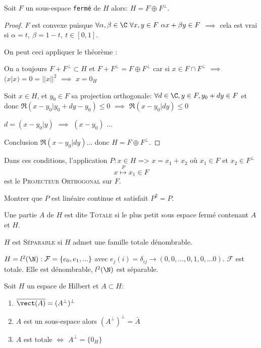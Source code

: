 \begin{theorem}[corollaire]
	Soit $F$ un sous-espace \texttt{fermé} de $H$ alors: $H=F\oplus F^\perp$.
\end{theorem}
\begin{proof}
\leavevmode

	$F$ est convexe puisque $\forall \alpha,\beta\in\C\ \forall x, y\in F\ \alpha x+\beta y\in F$ $\implies$ cela est vrai si $\alpha = t,\ \beta=1-t,\ t\in[0,1]$.
	
	On peut ceci appliquer le théorème :
	
	On a toujours $F+F^\perp \subset H$ et $F+F^\perp = F\oplus F^\perp$ car si $x\in F\cap F^\perp$ $\implies$ $(x|x)=0=||x||^2$ $\implies$ $x=0_H$
		
		Soit $x\in H$, et $y_0\in F$ sa projection orthogonale: $\forall d\in \C, y\in F, y_0+dy\in F$ et donc $\Re(x-y_0| y_0+dy-y_0)\leq 0$ $\implies$ $\Re(x-y_0|dy)\leq 0$
		
		$d=(x-y_0|y)$ $\implies$ $(x-y_0)$
		...
		
	Conclusion $\Re(x-y_0|dy)$... donc $H=F\oplus F^\perp$.
\end{proof}

\begin{definition}
	Dans ces conditions, l'application $P:x\in H$ => $x=x_1+x_2$ où $x_1\in F$ et $x_2\in F^\perp $
	$$x \overset{P}{\mapsto} x_1\in F$$
	 est le \textsc{Projecteur Orthogonal} sur $F$.
\end{definition}

\begin{example}
	Montrer que $P$ est linéaire continue et satisfait $P^2=P$.
\end{example}

\begin{definition}
	Une partie $A$ de $H$ est dite \textsc{Totale} si le plus petit sous espace fermé contenant $A$ et $H$.

	$H$ est \textsc{Séparable} si $H$ admet une famille totale dénombrable.
\end{definition}

\begin{example}
	$H=l^2(\N): \mathcal{F}=\{e_0, e_1, ...\}$ avec $e_j(i)=\delta_{ij}\to (0,0,..., 0,1,0,... 0)$. $\mathcal{F}$ est totale. Elle est dénombrable, $l^2(\N)$ est séparable.
\end{example}

\begin{theorem}
	Soit $H$ un espace de Hilbert et $A\subset H$:
	\begin{enumerate}
		\item $\overline{\vect(A)}=(A^\perp)^\perp$
		\item $A$ est un sous-espace alors $(A^\perp)^\perp=\bar A$
		\item $A$ est totale $\iff$ $A^\perp=\{0_H\}$
	\end{enumerate}
\end{theorem}


